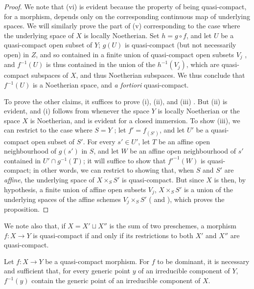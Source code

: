 \begin{proof}
We note that (vi) is evident because the property of being quasi-compact, for a morphism, depends only on the corresponding continuous map of underlying spaces.
We will similarly prove the part of (v) corresponding to the case where the underlying space of $X$ is locally Noetherian.
Set $h=g\circ f$, and let $U$ be a quasi-compact open subset of $Y$;
$g(U)$ is quasi-compact (but not necessarily open) in $Z$, and so contained in a finite union of quasi-compact open subsets $V_j$ , and $f^{-1}(U)$ is thus contained in the union of the $h^{-1}(V_j)$, which are quasi-compact subspaces of $X$, and thus Noetherian subspaces.
We thus conclude  that $f^{-1}(U)$ is a Noetherian space, and \emph{a fortiori} quasi-compact.

To prove the other claims, it suffices to prove (i), (ii), and (iii) .
But (ii) is evident, and (i) follows from  whenever the space $Y$ is locally Noetherian or the space $X$ is Noetherian, and is evident for a closed immersion.
To show (iii), we can restrict to the case where $S=Y$ ;
let $f'=f_{(S')}$, and let $U'$ be a quasi-compact open subset of $S'$.
For every $s'\in U'$, let $T$ be an affine open neighbourhood of $g(s')$ in $S$, and let $W$ be an affine open neighbourhood of $s'$ contained in $U'\cap g^{-1}(T)$;
it will suffice to show that $f'^{-1}(W)$ is quasi-compact;
in other words, we can restrict to showing that, when $S$ and $S'$ are \emph{affine}, the underlying space of $X\times_S S'$ is quasi-compact.
But since $X$ is then, by hypothesis, a finite union of affine open subsets $V_j$, $X\times_S S'$ is a union of the underlying spaces of the affine schemes $V_j\times_S S'$ ( and ), which proves the proposition.
\end{proof}

We note also that, if $X=X'\sqcup X''$ is the sum of two preschemes, a morphism $f:X\to Y$ is quasi-compact if and only if its restrictions to both $X'$ and $X''$ are quasi-compact.

\begin{proposition}[6.6.5]
\label{I.6.6.5}
Let $f:X\to Y$ be a quasi-compact morphism.
For $f$ to be dominant, it is necessary and sufficient that, for every generic point $y$ of an irreducible component of $Y$, $f^{-1}(y)$ contain the generic point of an irreducible component of $X$.
\end{proposition}

